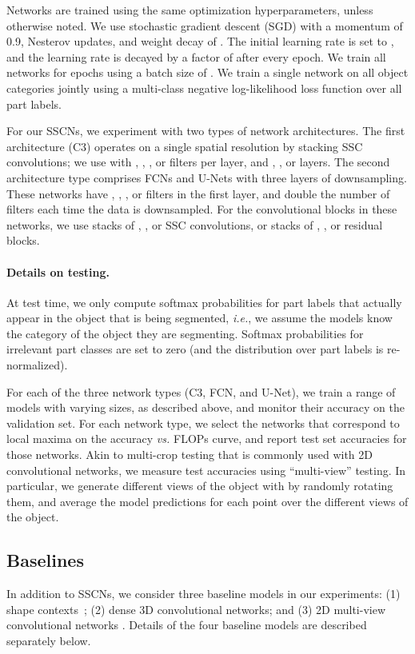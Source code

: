 \documentclass[10pt,twocolumn,letterpaper]{article}
\begin{document}
Networks are trained using the same optimization hyperparameters, unless otherwise noted. We use stochastic gradient descent (SGD) with a momentum of 0.9, Nesterov updates, and  weight decay of . The initial learning rate is set to , and the learning rate is decayed by a factor of  after every epoch.
We train all networks for  epochs using a batch size of . We train a single network on all  object categories jointly using a multi-class negative log-likelihood loss function over all  part labels.

For our SSCNs, we experiment with two types of network architectures. The first architecture (C3) operates on a single spatial resolution by stacking SSC convolutions; we use with , , , or  filters per layer, and , , or  layers. The second architecture type comprises FCNs and U-Nets with three layers of downsampling. These networks have , , , or  filters in the first layer, and double the number of filters each time the data is downsampled. For the convolutional blocks in these networks, we use stacks of , , or  SSC convolutions, or stacks of , , or  residual blocks.

\paragraph{Details on testing.}
At test time, we only compute softmax probabilities for part labels that actually appear in the object that is being segmented, \emph{i.e.}, we assume the models know the category of the object they are segmenting. Softmax probabilities for irrelevant part classes are set to zero (and the distribution over part labels is re-normalized).

For each of the three network types (C3, FCN, and U-Net), we train a range of models with varying sizes, as described above, and monitor their accuracy on the validation set. For each network type, we select the networks that correspond to local maxima on the accuracy \emph{vs.} FLOPs curve, and report test set accuracies for those networks. Akin to multi-crop testing that is commonly used with 2D convolutional networks, we measure test accuracies using ``multi-view'' testing. In particular, we generate  different views of the object with  by randomly rotating them, and average the model predictions for each point over the  different views of the object.


\subsection{Baselines}
In addition to SSCNs, we consider three baseline models in our experiments: (1) shape contexts~\cite{belongie2002shape}; (2) dense 3D convolutional networks; and (3) 2D multi-view convolutional networks \cite{conf/iccv/SuMKL15}. Details of the four baseline models are described separately below.
\end{document}
